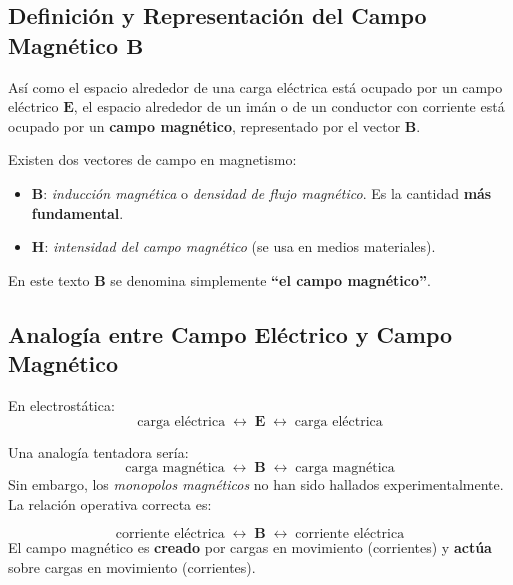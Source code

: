 \documentclass[12pt, letterpaper]{report}
\numberwithin{equation}{section}
\newcommand{\vB}[1]{\boldsymbol{#1}}          %
\begin{document}
\subsection{Definición y Representación del Campo Magnético \texorpdfstring{$\vB{B}$}{B}}

Así como el espacio alrededor de una carga eléctrica está ocupado por un campo
eléctrico $\vB{E}$, el espacio alrededor de un imán o de un conductor con
corriente está ocupado por un \textbf{campo magnético}, representado por el
vector $\vB{B}$.

\begin{tcolorbox}[notebox, title=Nota terminológica importante]
  Existen dos vectores de campo en magnetismo:
  \begin{itemize}[leftmargin=1.5em, itemsep=1pt]
    \item $\vB{B}$: \textit{inducción magnética} o \textit{densidad de flujo
          magnético}. Es la cantidad \textbf{más fundamental}.
    \item $\vB{H}$: \textit{intensidad del campo magnético} (se usa en medios
          materiales).
  \end{itemize}
  En este texto $\vB{B}$ se denomina simplemente
  \textbf{``el campo magnético''}.
\end{tcolorbox}

\subsection{Analogía entre Campo Eléctrico y Campo Magnético}

En electrostática:
\[
  \text{carga eléctrica} \;\longleftrightarrow\; \vB{E}
  \;\longleftrightarrow\; \text{carga eléctrica}
\]

Una analogía tentadora sería:
\[
  \text{carga magnética} \;\longleftrightarrow\; \vB{B}
  \;\longleftrightarrow\; \text{carga magnética}
\]
Sin embargo, los \textit{monopolos magnéticos} no han sido hallados
experimentalmente. La relación operativa correcta es:

\begin{tcolorbox}[defbox, title=Relación fundamental del campo magnético]
  \[
    \text{corriente eléctrica} \;\longleftrightarrow\; \vB{B}
    \;\longleftrightarrow\; \text{corriente eléctrica}
  \]
  El campo magnético es \textbf{creado} por cargas en movimiento (corrientes)
  y \textbf{actúa} sobre cargas en movimiento (corrientes).
\end{tcolorbox}
\end{document}
